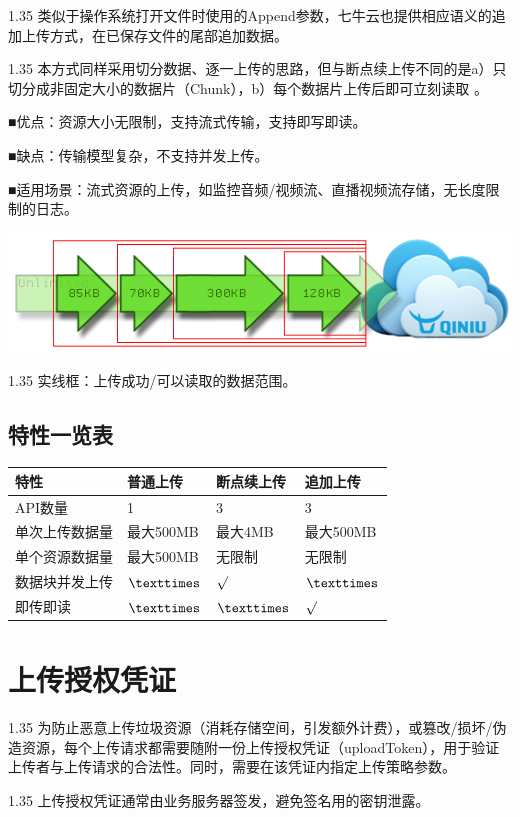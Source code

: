 \documentclass[11pt, oneside]{book}
\newcommand{\qpara}[1]{
\vspace{0.2em}
\begin{spacing}{1.35}
\noindent
#1\par
\end{spacing}
\vspace{0.2em}
}
\newcommand{\qblock}[1]{
\vspace{0.1em}
\noindent
#1\par
\vspace{0.1em}
}
\newcommand{\qtable}[1]{\footnotesize\vspace{0.5em}#1\vspace{0.5em}\normalsize}
\begin{document}
\qpara{类似于操作系统打开文件时使用的Append参数，七牛云也提供相应语义的追加上传方式，在已保存文件的尾部追加数据。}
\qpara{本方式同样采用切分数据、逐一上传的思路，但与断点续上传不同的是a）只切分成非固定大小的数据片（Chunk），b）每个数据片上传后即可立刻读取 。}
\qblock{■\thinspace 优点：资源大小无限制，支持流式传输，支持即写即读。}
\qblock{■\thinspace 缺点：传输模型复杂，不支持并发上传。}
\qblock{■\thinspace 适用场景：流式资源的上传，如监控音频/视频流、直播视频流存储，无长度限制的日志。}

\begin{center}
\includegraphics[scale=1]{../pics/upload/one_append.png}
\end{center}

\qpara{实线框：上传成功/可以读取的数据范围。}

\section{特性一览表}

\qtable{
\def\arraystretch{2}
\begin{tabular}{|l|p{10em}|p{10em}|p{10em}|}
\hline
特性 & 普通上传 & 断点续上传 & 追加上传 \\
\hline
API数量 & 1 & 3 & 3 \\
\hline
单次上传数据量 & 最大500MB & 最大4MB & 最大500MB \\
\hline
单个资源数据量 & 最大500MB & 无限制 & 无限制 \\
\hline
数据块并发上传 & ${\texttimes}$ & ${\surd}$ & ${\texttimes}$ \\
\hline
即传即读 & ${\texttimes}$ & ${\texttimes}$ & ${\surd}$ \\
\hline
\end{tabular}
}

\clearpage

\chapter{上传授权凭证}

\qpara{为防止恶意上传垃圾资源（消耗存储空间，引发额外计费），或篡改/损坏/伪造资源，每个上传请求都需要随附一份上传授权凭证（uploadToken），用于验证上传者与上传请求的合法性。同时，需要在该凭证内指定上传策略参数。}
\qpara{上传授权凭证通常由业务服务器签发，避免签名用的密钥泄露。}
\end{document}
